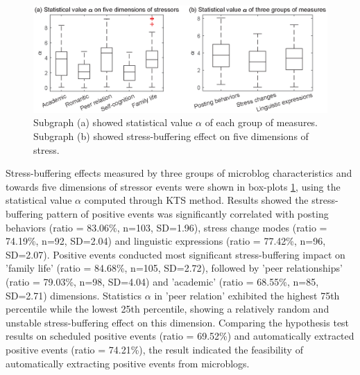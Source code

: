 \begin{figure}[h]
\centering
\includegraphics[width=\linewidth]{figs/cor.eps}%
\caption{\small{ Subgraph (a) showed statistical value $\alpha$ of each group of measures.
Subgraph (b) showed stress-buffering effect on five dimensions of stress.}}
\label{fig:correlation}
\end{figure}

Stress-buffering effects measured by three groups of microblog characteristics and towards five dimensions of stressor events were shown in box-plots \ref{fig:correlation},
using the statistical value $\alpha$ computed through KTS method.
Results showed the stress-buffering pattern of positive events
was significantly correlated with posting behaviors (ratio = 83.06\%, n=103, SD=1.96),
stress change modes (ratio = 74.19\%, n=92, SD=2.04) and linguistic expressions (ratio = 77.42\%, n=96, SD=2.07).
Positive events conducted most significant stress-buffering impact on 'family life' (ratio = 84.68\%, n=105, SD=2.72),
followed by 'peer relationships' (ratio = 79.03\%, n=98, SD=4.04) and 'academic' (ratio = 68.55\%, n=85, SD=2.71) dimensions.
Statistics $\alpha$ in 'peer relation'
exhibited the highest 75th percentile while the lowest 25th percentile,
showing a relatively random and unstable stress-buffering effect on this dimension.
Comparing the hypothesis test results on scheduled positive events (ratio = 69.52\%)
and automatically extracted positive events (ratio = 74.21\%),
the result indicated the feasibility of automatically extracting positive events from microblogs.

